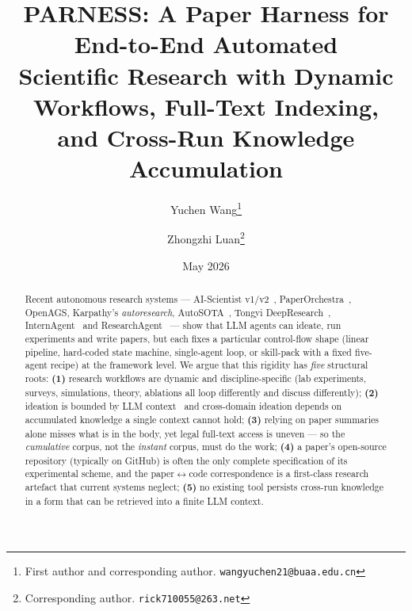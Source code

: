 \documentclass{article}
\title{\textsf{PARNESS}: A Paper Harness for End-to-End Automated\\
  Scientific Research with Dynamic Workflows, Full-Text Indexing,\\
  and Cross-Run Knowledge Accumulation}
\author[1]{Yuchen Wang\thanks{First author and corresponding author.
  \texttt{wangyuchen21@buaa.edu.cn}}}
\author[1]{Zhongzhi Luan\thanks{Corresponding author.
  \texttt{rick710055@263.net}}}
\affil[1]{Sino-German Joint Software Institute, Beihang University, Beijing, China}
\date{May 2026}
\begin{document}
\maketitle

\begin{abstract}
\noindent
Recent autonomous research systems --- AI-Scientist v1/v2~\cite{aisciv1,aisciv2},
PaperOrchestra~\cite{paperorchestra}, OpenAGS, Karpathy's
\emph{autoresearch}, AutoSOTA~\cite{autosota}, Tongyi DeepResearch~\cite{deepresearch},
InternAgent~\cite{internagent} and ResearchAgent~\cite{researchagent} --- show
that LLM agents can ideate, run experiments and write papers, but each fixes
a particular control-flow shape (linear pipeline, hard-coded state machine,
single-agent loop, or skill-pack with a fixed five-agent recipe) at the
framework level. We argue that this rigidity has \emph{five} structural
roots: \textbf{(1)} research workflows are dynamic and discipline-specific
(lab experiments, surveys, simulations, theory, ablations all loop
differently and discuss differently); \textbf{(2)} ideation is bounded by
LLM context~\cite{lostmiddle} and cross-domain ideation depends on
accumulated knowledge a single context cannot hold;
\textbf{(3)} relying on paper summaries alone misses what is in the body,
yet legal full-text access is uneven --- so the \emph{cumulative} corpus,
not the \emph{instant} corpus, must do the work; \textbf{(4)} a paper's
open-source repository (typically on GitHub) is often the only complete
specification of its experimental scheme, and the paper$\leftrightarrow$code
correspondence is a first-class research artefact that current systems
neglect; \textbf{(5)} no existing tool persists cross-run knowledge in a
form that can be retrieved into a finite LLM context.


\end{abstract}
\end{document}

